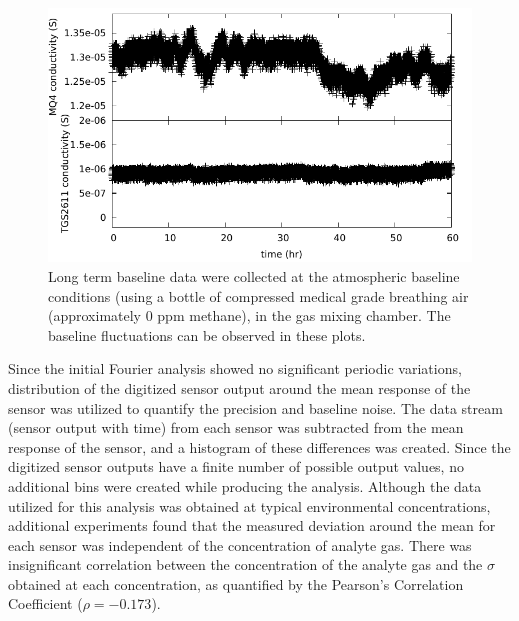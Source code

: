 \documentclass[times]{joehreview}
\begin{document}
	\begin{figure}[!t]
		\centering
		\includegraphics[width=\columnwidth]{honey5.pdf}
		\caption{Long term baseline data were collected at the atmospheric baseline conditions (using a bottle of compressed medical grade breathing air (approximately 0 ppm methane), in the gas mixing chamber.  The baseline fluctuations can be observed in these plots.}
		\label{fig:MQ4TGSbaseline}
	\end{figure}
	
	Since the initial Fourier analysis showed no significant periodic variations, distribution of the digitized sensor output around the mean response of the sensor was utilized to quantify the precision and baseline noise.  The data stream (sensor output with time) from each sensor was subtracted from the mean response of the sensor, and a histogram of these differences was created. Since the digitized sensor outputs have a finite number of possible output values, no additional bins were created while producing the analysis.  Although the data utilized for this analysis was obtained at typical environmental concentrations, additional experiments found that the measured deviation around the mean for each sensor was independent of the concentration of analyte gas.  There was insignificant correlation between the concentration of the analyte gas and the $\sigma$ obtained at each concentration, as quantified by the Pearson's Correlation Coefficient ($\rho=-0.173$).
	
\end{document}
